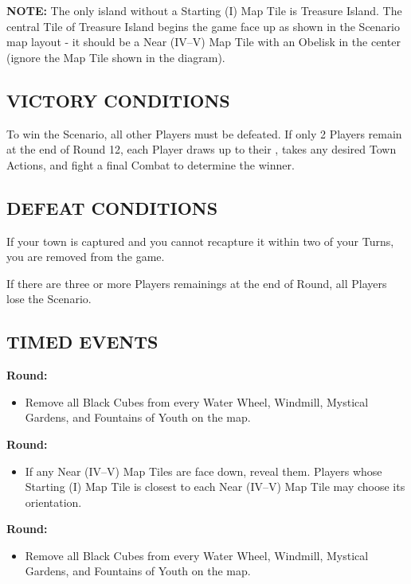 \begin{multicols*}{2}
\textbf{\MakeUppercase{Note:}} The only island without a Starting (I) Map Tile is Treasure Island. The central Tile of Treasure Island begins the game face up as shown in the Scenario map layout - it should be a Near (IV--V) Map Tile with an Obelisk in the center (ignore the Map Tile shown in the diagram).

\subsection*{\MakeUppercase{Victory Conditions}}
To win the Scenario, all other Players must be defeated. If only 2 Players remain at the end of Round 12, each Player draws up to their , takes any desired Town Actions, and fight a final Combat to determine the winner.

\subsection*{\MakeUppercase{Defeat Conditions}}
If your town is captured and you cannot recapture it within two of your Turns, you are removed from the game.

If there are three or more Players remainings at the end of  Round, all Players lose the Scenario.

\subsection*{\MakeUppercase{Timed Events}}

\textbf{ Round:}
\begin{itemize}
  \item Remove all Black Cubes from every Water Wheel, Windmill, Mystical Gardens, and Fountains of Youth on the map.
\end{itemize}

\textbf{ Round:}
\begin{itemize}
  \item If any Near (IV--V) Map Tiles are face down, reveal them. Players whose Starting (I) Map Tile is closest to each Near (IV--V) Map Tile may choose its orientation.
\end{itemize}

\textbf{ Round:}
\begin{itemize}
  \item Remove all Black Cubes from every Water Wheel, Windmill, Mystical Gardens, and Fountains of Youth on the map.
\end{itemize}


\end{multicols*}
